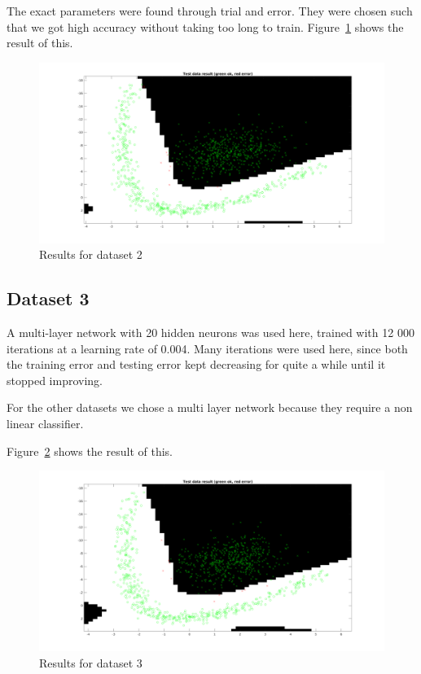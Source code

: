 \documentclass{article}
\begin{document}
The exact parameters were found through trial and error. They were chosen such
that we got high accuracy without taking too long to train.
Figure~\ref{fig:res2} shows the result of this.

\begin{figure}
    \includegraphics[width=13cm]{dataset2res.png}
    \caption{Results for dataset 2}
    \label{fig:res2}
\end{figure}

\subsection{Dataset 3}

A multi-layer network with 20 hidden neurons was used here, trained with 12 000
iterations at a learning rate of 0.004. Many iterations were used here, since
both the training error and testing error kept decreasing for quite a while
until it stopped improving.

For the other datasets we chose a multi layer network because they
require a non linear classifier.

Figure~\ref{fig:res3} shows the result of this.

\begin{figure}
    \includegraphics[width=13cm]{dataset3res.png}
    \caption{Results for dataset 3}
    \label{fig:res3}
\end{figure}
\end{document}
